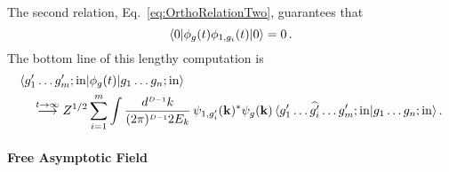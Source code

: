 The second relation, Eq.~\eqref{eq:OrthoRelationTwo}, guarantees that 
\begin{equation}
    \langle 0 | \phi_{g}(t)  \phi_{1,g_i}(t) | 0 \rangle = 0\, .
\end{equation}
The bottom line of this lengthy computation is 
\begin{align}
    &\langle g'_1 \ldots g'_m; \mathrm{in} | \phi_{g}(t) | g_1 \ldots g_n; \mathrm{in} \rangle 
    \nonumber \\
    \label{eq:SmearedFieldInstateME}
    & \quad \stackrel{t\to\infty}{\longrightarrow}
    Z^{1/2} \sum_{i=1}^m \int \frac{d^{\scriptscriptstyle{D-1}}k}{(2\pi)^{\scriptscriptstyle{D-1}} 2E_k}\,
    \psi_{1,g'_i}(\mathbf{k})^* \psi_g(\mathbf{k})\,
    \langle g'_1 \ldots \widehat{g'_i} \ldots g'_m; \mathrm{in} | g_1 \ldots g_n; \mathrm{in} \rangle\, .
\end{align}

\paragraph{Free Asymptotic Field}

